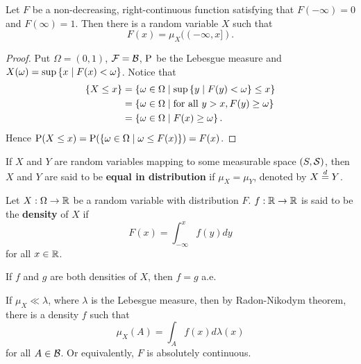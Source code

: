 \begin{theorem}
    Let $F$ be a non-decreasing, right-continuous function satisfying that 
    $F(-\infty) = 0$ and $F(\infty) = 1$. Then there is a random variable 
    $X$ such that 
    \begin{equation*}
        F(x) = \mu_X((-\infty, x]).
    \end{equation*}
\end{theorem}
\begin{proof}
    Put $\Omega = (0,1)$, $\F = \B$, $\P$ be the Lebesgue measure and 
    $X(\omega) = \sup\Set{x}{F(x)< \omega}$. Notice that 
    \begin{equation*}
        \begin{split}
            \set{X\leq x} &= \Set{\omega\in\Omega}{\sup\Set{y}{F(y)<\omega}\leq x} \\ 
            &= \Set{\omega\in\Omega}{\text{for all } y>x, F(y)\geq \omega} \\
            &= \Set{\omega\in\Omega}{F(x)\geq \omega}.
        \end{split}
    \end{equation*}
    Hence $\P(X\leq x) = \P(\Set{\omega\in\Omega}{\omega \leq F(x)}) = F(x)$.
\end{proof}

\begin{definition}
    If $X$ and $Y$ are random variables mapping to some measurable space 
    $(S,\S)$, then $X$ and $Y$ are said to be \textbf{equal in distribution} 
    if $\mu_X = \mu_Y$, denoted by $X\deq Y$. 
\end{definition}

\begin{definition}
    Let $X:\Omega\to \R$ be a random variable with distribution $F$. $f:\R\to\R$ 
    is said to be the \textbf{density} of $X$ if
    \begin{equation*}
        F(x) = \int_{-\infty}^x f(y)dy 
    \end{equation*}
    for all $x\in\R$.
\end{definition}
\begin{remark}
    If $f$ and $g$ are both densities of $X$, then $f = g$ a.e. 
\end{remark}
\begin{remark}
    If $\mu_X\ll \lambda$, where $\lambda$ is the Lebesgue measure, then by Radon-Nikodym 
    theorem, there is a density $f$ such that
    \begin{equation*}
        \mu_X(A) = \int_A f(x)d\lambda(x)
    \end{equation*}
    for all $A\in\B$. Or equivalently, $F$ is absolutely continuous. 
\end{remark}

